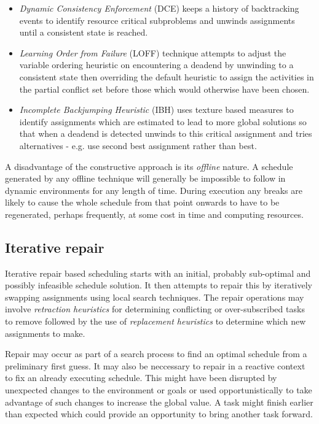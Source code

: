 \begin{description}
\begin{itemize} 
\item \emph{Dynamic Consistency Enforcement} (DCE) keeps a history of backtracking events to identify resource critical subproblems and unwinds assignments until a consistent state is reached.
\item \emph{Learning Order from Failure} (LOFF) technique attempts to adjust the variable ordering heuristic on encountering a deadend by unwinding to a consistent state then overriding the default heuristic to assign the activities in the partial conflict set before those which would otherwise have been chosen.
\item \emph{Incomplete Backjumping Heuristic} (IBH) uses texture based measures \citep{beck97texturebased} to identify assignments which are estimated to lead to more global solutions so that when a deadend is detected unwinds to this critical assignment and tries alternatives - e.g. use second best assignment rather than best. 
\end{itemize}

\end{description}

A disadvantage of the constructive approach is its \emph{offline} nature. A schedule generated by any offline technique will generally be impossible to follow in dynamic environments for any length of time. During execution any breaks are likely to cause the whole schedule from that point onwards to have to be regenerated, perhaps frequently, at some cost in time and computing resources.

%
%
\subsection{Iterative repair}
\label{sub:review_iterative}
Iterative repair based scheduling starts with an initial, probably sub-optimal and possibly infeasible schedule solution. It then  attempts to repair this by iteratively swapping assignments using local search techniques. The repair operations may involve \emph{retraction heuristics} for determining conflicting or over-subscribed tasks to remove followed by the use of \emph{replacement heuristics} to determine which new assignments to make. 

Repair may occur as part of a search process to find an optimal schedule from a preliminary first guess. It may also be neccessary to repair in a reactive context to fix an already executing schedule. This might have been disrupted by unexpected changes to the environment or goals or used opportunistically to take advantage of such changes to increase the global value. A task might finish earlier than expected which could provide an opportunity to bring another task forward.

